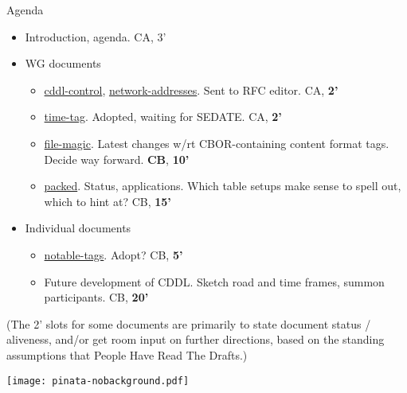 \documentclass[aspectratio=169]{beamer}
\begin{document}
\begin{frame}{Agenda}\large
    \begin{itemize}
        \item Introduction, agenda. CA, 3’

        \item WG documents
            \begin{itemize}
                \item \href{https://datatracker.ietf.org/doc/draft-ietf-cbor-cddl-control/}{cddl-control},
                    \href{https://datatracker.ietf.org/doc/draft-ietf-cbor-network-addresses/}{network-addresses}.
                    Sent to RFC editor. CA, \textbf{2'}
                \item \href{https://datatracker.ietf.org/doc/draft-ietf-cbor-time-tag/}{time-tag}. Adopted, waiting for SEDATE. CA, \textbf{2'}
                \item \href{https://datatracker.ietf.org/doc/draft-ietf-cbor-file-magic/}{file-magic}. Latest changes w/rt CBOR-containing content format tags. Decide way forward. \textbf{CB}, \textbf{10'}
                \item \href{https://datatracker.ietf.org/doc/draft-ietf-cbor-packed/}{packed}. Status, applications. Which table setups make sense to spell out, which to hint at? CB, \textbf{15'}
            \end{itemize}

            \item Individual documents
            \begin{itemize}
                \item \href{https://datatracker.ietf.org/doc/draft-bormann-cbor-edn-literals/}{notable-tags}. Adopt? CB, \textbf{5'}
                \item Future development of CDDL. Sketch road and time frames, summon participants. CB, \textbf{20'}
            \end{itemize}
    \end{itemize}

    \small (The 2’ slots for some documents are primarily to state document status / aliveness, and/or get room input on further directions, based on the standing assumptions that People Have Read The Drafts.)

    \vspace{-3cm}
    \begin{block}{\texttt{[image: pinata-nobackground.pdf]}\mbox{\quad}}
    \end{block}
\end{frame}
\end{document}
